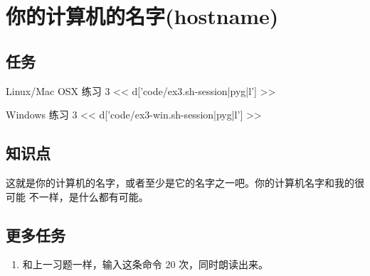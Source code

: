 \chapter{你的计算机的名字(hostname)}

\section{任务}

\begin{code}{Linux/Mac OSX 练习 3}
<< d['code/ex3.sh-session|pyg|l'] >>
\end{code}

\begin{code}{Windows 练习 3}
<< d['code/ex3-win.sh-session|pyg|l'] >>
\end{code}

\section{知识点}

这就是你的计算机的名字，或者至少是它的名字之一吧。你的计算机名字和我的很可能
不一样，是什么都有可能。

\section{更多任务}

\begin{enumerate}
\item 和上一习题一样，输入这条命令 20 次，同时朗读出来。
\end{enumerate}

